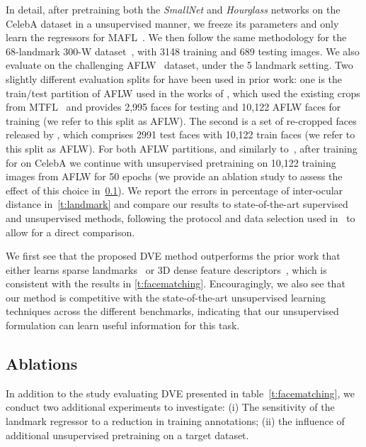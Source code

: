 \documentclass[10pt,twocolumn,letterpaper]{article}
\begin{document}
In detail, after pretraining both the \textit{SmallNet} and \textit{Hourglass} networks on the CelebA dataset in a unsupervised manner, we freeze its parameters and only learn the regressors for MAFL~\cite{Zhang2016}.  We then follow the same methodology for the 68-landmark 300-W dataset~\cite{sagonas2013}, with 3148 training and 689 testing images.  We also evaluate on the challenging AFLW~\cite{koestinger2011} dataset, under the 5 landmark setting.  Two slightly different evaluation splits for have been used in prior work: one is the train/test partition of AFLW used in the works of \cite{thewlis17unsupervised}, \cite{thewlis17Bunsupervised} which used the existing crops from MTFL~\cite{zhang2014facial} and provides 2,995 faces for testing and 10,122 AFLW faces for training (we refer to this split as AFLW).  The second is a set of re-cropped faces released by \cite{zhang2018unsupervised}, which comprises 2991 test faces with 10,122 train faces (we refer to this split as AFLW).  For both AFLW partitions, and similarly to~\cite{thewlis17Bunsupervised}, after training for on CelebA we continue with unsupervised pretraining on 10,122 training images from AFLW for 50 epochs (we provide an ablation study to assess the effect of this choice in~\cref{subsec:ablations}).  We report the errors in percentage of inter-ocular distance in~\cref{t:landmark} and compare our results to state-of-the-art supervised and unsupervised methods, following the protocol and data selection used in~\cite{thewlis17Bunsupervised} to allow for a direct comparison.

We first see that the proposed DVE method outperforms the prior work that either learns sparse landmarks~\cite{thewlis17unsupervised} or 3D dense feature descriptors~\cite{thewlis17Bunsupervised}, which is consistent with the results in \cref{t:facematching}.  Encouragingly, we also see that our method is competitive with the state-of-the-art unsupervised learning techniques across the different benchmarks, indicating that our unsupervised formulation can learn useful information for this task. 


\subsection{Ablations}\label{subsec:ablations}

In addition to the study evaluating DVE presented in table~\ref{t:facematching}, we conduct two additional experiments to investigate: (i) The sensitivity of the landmark regressor to a reduction in training annotations; (ii) the influence of additional unsupervised pretraining on a target dataset.\\
\end{document}
